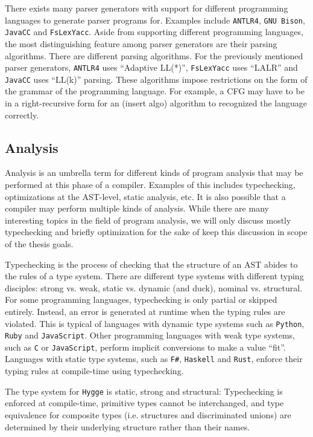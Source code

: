 There exists many parser generators with support for different programming languages to generate parser programs for. Examples include \texttt{ANTLR4}, \texttt{GNU Bison},
\texttt{JavaCC} and \texttt{FsLexYacc}. Aside from supporting different programming languages, the most distinguishing feature among parser generators are their parsing algorithms.
There are different parsing algorithms. For the previously mentioned parser generators, \texttt{ANTLR4} uses ``Adaptive LL(*)'', \texttt{FsLexYacc} uses ``LALR'' and \texttt{JavaCC}
uses ``LL(k)'' parsing. These algorithms impose restrictions on the form of the grammar of the programming language. For example, a CFG may have to be in a right-recursive
form for an (insert algo) algorithm to recognized the language correctly.

\subsection{Analysis}

Analysis is an umbrella term for different kinds of program analysis that may be performed at this phase of a compiler. Examples of this includes typechecking, optimizations at the AST-level,
static analysis, etc. It is also possible that a compiler may perform multiple kinds of analysis. While there are many interesting topics in the field of program analysis,
we will only discuss mostly typechecking and briefly optimization for the sake of keep this discussion in scope of the thesis goals.

Typechecking is the process of checking that the structure of an AST abides to the rules of a type system. There are different type systems with different typing disciples:
strong vs. weak, static vs. dynamic (and duck), nominal vs. structural. For some programming languages, typechecking is only partial or skipped entirely. Instead,
an error is generated at runtime when the typing rules are violated. This is typical of languages with dynamic type systems such as \texttt{Python}, \texttt{Ruby} and
\texttt{JavaScript}. Other programming languages with weak type systems, such as \texttt{C} or \texttt{JavaScript}, perform implicit conversions to make a value ``fit''.
Languages with static type systems, such as \texttt{F\#}, \texttt{Haskell} and \texttt{Rust}, enforce their typing rules at compile-time using typechecking.

The type system for \texttt{Hygge} is static, strong and structural: Typechecking is enforced at compile-time, primitive types cannot be interchanged, and type
equivalence for composite types (i.e. structures and discriminated unions) are determined by their underlying structure rather than their names. 

